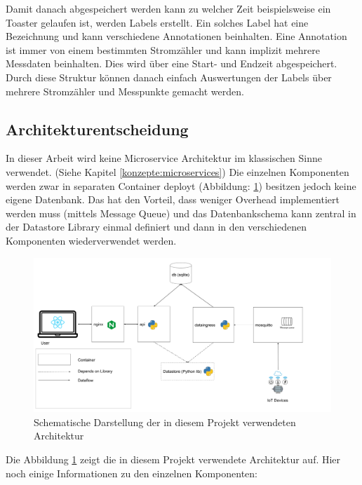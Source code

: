 Damit danach abgespeichert werden kann zu welcher Zeit beispielsweise ein
Toaster gelaufen ist, werden Labels erstellt. Ein solches Label hat eine
Bezeichnung und kann verschiedene Annotationen beinhalten.
Eine Annotation ist immer von einem bestimmten Stromzähler und kann implizit mehrere
Messdaten beinhalten. Dies wird über eine Start- und Endzeit abgespeichert.
Durch diese Struktur können danach einfach Auswertungen der Labels über mehrere
Stromzähler und Messpunkte gemacht werden.

\subsection{Architekturentscheidung}
\label{architekturentscheidung}

In dieser Arbeit wird keine Microservice Architektur im klassischen Sinne verwendet. (Siehe Kapitel \ref{konzepte:microservices})
Die einzelnen Komponenten werden zwar in separaten Container deployt (Abbildung: \ref{fig:smic-arch})
besitzen jedoch keine eigene Datenbank.
Das hat den Vorteil, dass weniger Overhead implementiert werden muss (mittels Message Queue)
und das Datenbankschema kann zentral in der Datastore Library einmal definiert
und dann in den verschiedenen Komponenten wiederverwendet werden.


\begin{figure}[h]
    \centering
    \includegraphics[width=1.0\textwidth]{gfx/smic-arch}
    \caption{
        Schematische Darstellung der in diesem Projekt verwendeten Architektur
    }
    \label{fig:smic-arch}
\end{figure}

Die Abbildung \ref{fig:smic-arch} zeigt die in diesem Projekt verwendete
Architektur auf. Hier noch einige Informationen zu den einzelnen Komponenten:


